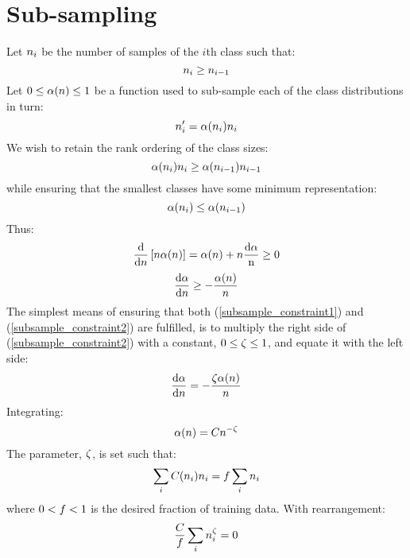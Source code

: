 \section{Sub-sampling}
\label{shuttle_subsampling}

Let $n_i$ be the number of samples of the $i$th class such
that:
\begin{equation}
n_i \ge n_{i-1}
\end{equation}
Let $0 \le \alpha(n) \le 1$ be a function used to sub-sample each of the class
distributions in turn:
\begin{equation}
n_i^\prime = \alpha(n_i) n_i
\end{equation}
We wish to retain the rank ordering of the class sizes:
\begin{equation}
\alpha(n_i) n_i 
\ge \alpha(n_{i-1}) n_{i-1} 
\end{equation}
while ensuring that the smallest classes have some minimum representation:
\begin{equation}
\alpha(n_i) \le \alpha(n_{i-1})
\label{subsample_constraint1}
\end{equation}
Thus:
\begin{equation}
	\frac{\mathrm d}{\mathrm d n} \left [ n \alpha(n) \right ] = \alpha(n) + n \frac{\mathrm d \alpha}{\mathrm n} \ge 0
\end{equation}
\begin{equation}
	\frac{\mathrm d \alpha}{\mathrm d n} \ge - \frac{\alpha(n)}{n}
\label{subsample_constraint2}
\end{equation}
The simplest means of ensuring that both (\ref{subsample_constraint1}) and
(\ref{subsample_constraint2}) are fulfilled, is to multiply the right side
of (\ref{subsample_constraint2}) with a constant, $0 \le \zeta \le 1$,
and equate it with the left side:
\begin{equation}
	\frac{\mathrm d \alpha}{\mathrm d n} = - \frac{\zeta \alpha(n)}{n}
\end{equation}
Integrating:
\begin{equation}
	\alpha(n)=C n^{-\zeta}
\end{equation}
The parameter, $\zeta$, is set such that:
\begin{equation}
	\sum_i C(n_i) n_i = f \sum_i n_i
\end{equation}
where $0 < f < 1$ is the desired fraction of training data.
With rearrangement:
\begin{equation}
	\frac{C}{f} \sum_i n_i^\zeta = 0
\end{equation}

